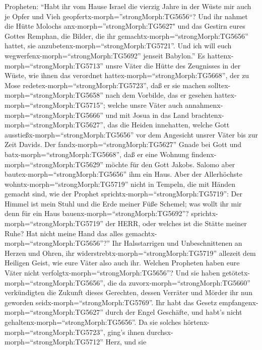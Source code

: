 Propheten: ``Habt ihr vom Hause Israel die vierzig Jahre in der Wüste
mir auch je Opfer und Vieh geopfertx-morph=''strongMorph:TG5656``?
 Und ihr nahmet die Hütte Molochs
anx-morph=''strongMorph:TG5627" und das Gestirn eures Gottes Remphan,
die Bilder, die ihr gemachtx-morph=``strongMorph:TG5656'' hattet, sie
anzubetenx-morph=``strongMorph:TG5721''. Und ich will euch
wegwerfenx-morph=``strongMorph:TG5692'' jenseit Babylon.'' 
Es hattenx-morph=``strongMorph:TG5713'' unsre Väter die Hütte des
Zeugnisses in der Wüste, wie ihnen das verordnet
hattex-morph=``strongMorph:TG5668'', der zu Mose
redetex-morph=``strongMorph:TG5723'', daß er sie machen
solltex-morph=``strongMorph:TG5658'' nach dem Vorbilde, das er gesehen
hattex-morph=``strongMorph:TG5715'';  welche unsre Väter
auch annahmenx-morph=``strongMorph:TG5666'' und mit Josua in das Land
brachtenx-morph=``strongMorph:TG5627'', das die Heiden innehatten,
welche Gott ausstießx-morph=``strongMorph:TG5656'' vor dem Angesicht
unsrer Väter bis zur Zeit Davids.  Der
fandx-morph=``strongMorph:TG5627'' Gnade bei Gott und
batx-morph=``strongMorph:TG5668'', daß er eine Wohnung
findenx-morph=``strongMorph:TG5629'' möchte für den Gott Jakobs.
 Salomo aber bautex-morph=``strongMorph:TG5656'' ihm ein
Haus.  Aber der Allerhöchste
wohntx-morph=``strongMorph:TG5719'' nicht in Tempeln, die mit Händen
gemacht sind, wie der Prophet sprichtx-morph=``strongMorph:TG5719'':
 Der Himmel ist mein Stuhl und die Erde meiner Füße
Schemel; was wollt ihr mir denn für ein Haus
bauenx-morph=``strongMorph:TG5692''?
sprichtx-morph=``strongMorph:TG5719'' der HERR, oder welches ist die
Stätte meiner Ruhe?  Hat nicht meine Hand das alles
gemachtx-morph=``strongMorph:TG5656''?''  Ihr Halsstarrigen
und Unbeschnittenen an Herzen und Ohren, ihr
widerstrebtx-morph=``strongMorph:TG5719'' allezeit dem Heiligen Geist,
wie eure Väter also auch ihr.  Welchen Propheten haben eure
Väter nicht verfolgtx-morph=``strongMorph:TG5656''? Und sie haben
getötetx-morph=``strongMorph:TG5656'', die da
zuvorx-morph=``strongMorph:TG5660'' verkündigten die Zukunft dieses
Gerechten, dessen Verräter und Mörder ihr nun geworden
seidx-morph=``strongMorph:TG5769''.  Ihr habt das Gesetz
empfangenx-morph=``strongMorph:TG5627'' durch der Engel Geschäfte, und
habt's nicht gehaltenx-morph=``strongMorph:TG5656''.  Da
sie solches hörtenx-morph=``strongMorph:TG5723'', ging's ihnen
durchsx-morph=``strongMorph:TG5712'' Herz, und sie
